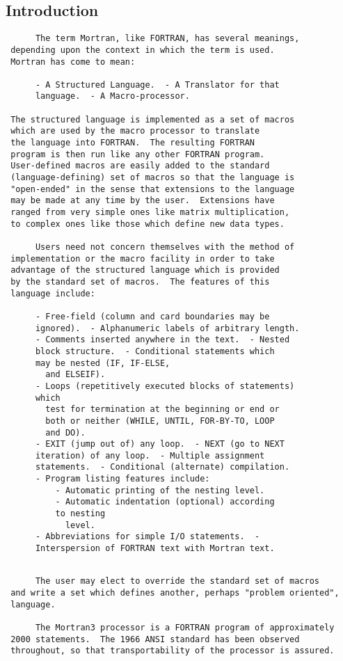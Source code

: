  \subsection{Introduction} 
 \begin{verbatim}
      The term Mortran, like FORTRAN, has several meanings,
 depending upon the context in which the term is used.
 Mortran has come to mean:

      - A Structured Language.  - A Translator for that
      language.  - A Macro-processor.

 The structured language is implemented as a set of macros
 which are used by the macro processor to translate
 the language into FORTRAN.  The resulting FORTRAN
 program is then run like any other FORTRAN program.
 User-defined macros are easily added to the standard
 (language-defining) set of macros so that the language is
 "open-ended" in the sense that extensions to the language
 may be made at any time by the user.  Extensions have
 ranged from very simple ones like matrix multiplication,
 to complex ones like those which define new data types.

      Users need not concern themselves with the method of
 implementation or the macro facility in order to take
 advantage of the structured language which is provided
 by the standard set of macros.  The features of this
 language include:

      - Free-field (column and card boundaries may be
      ignored).  - Alphanumeric labels of arbitrary length.
      - Comments inserted anywhere in the text.  - Nested
      block structure.  - Conditional statements which
      may be nested (IF, IF-ELSE,
        and ELSEIF).
      - Loops (repetitively executed blocks of statements)
      which
        test for termination at the beginning or end or
        both or neither (WHILE, UNTIL, FOR-BY-TO, LOOP
        and DO).
      - EXIT (jump out of) any loop.  - NEXT (go to NEXT
      iteration) of any loop.  - Multiple assignment
      statements.  - Conditional (alternate) compilation.
      - Program listing features include:
          - Automatic printing of the nesting level.
          - Automatic indentation (optional) according
          to nesting
            level.
      - Abbreviations for simple I/O statements.  -
      Interspersion of FORTRAN text with Mortran text.
\end{verbatim}

\newpage \begin{verbatim}

      The user may elect to override the standard set of macros
 and write a set which defines another, perhaps "problem oriented",
 language.

      The Mortran3 processor is a FORTRAN program of approximately
 2000 statements.  The 1966 ANSI standard has been observed
 throughout, so that transportability of the processor is assured.

 \end{verbatim}
